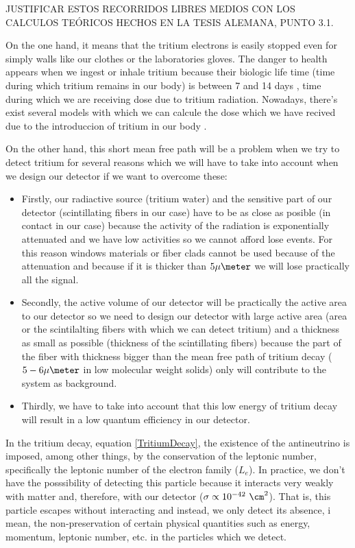 JUSTIFICAR ESTOS RECORRIDOS LIBRES MEDIOS CON LOS CALCULOS TEÓRICOS HECHOS EN LA TESIS ALEMANA, PUNTO 3.1.

On the one hand, it means that the tritium electrons is easily stopped even for simply walls like our clothes or the laboratories gloves. The danger to health appears when we ingest or inhale tritium because their biologic life time (time during which tritium remains in our body) is between 7 and 14 days \cite{asdfass}, time during which we are receiving dose due to tritium radiation. Nowadays, there's exist several models with which we can calcule the dose which we have recived due to the introduccion of tritium in our body \cite{asdfasdf}. 

On the other hand, this short mean free path will be a problem when we try to detect tritium for several reasons which we will have to take into account when we design our detector if we want to overcome these: 

\begin{itemize}
\item{} Firstly, our radiactive source (tritium water) and the sensitive part of our detector (scintillating fibers in our case) have to be as close as posible (in contact in our case) because the activity of the radiation is exponentially attenuated and we have low activities so we cannot afford lose events. For this reason windows materials or fiber clads cannot be used because of the attenuation and because if it is thicker than $5\mu\meter$ we will lose practically all the signal.

\item{} Secondly, the active volume of our detector will be practically the active area to our detector so we need to design our detector with large active area (area or the scintilalting fibers with which we can detect tritium) and a thickness as small as possible (thickness of the scintillating fibers) because the part of the fiber with thickness bigger than the mean free path of tritium decay ($5-6 \mu\meter$ in low molecular weight solids) only will contribute to the system as background.

\item{} Thirdly, we have to take into account that this low energy of tritium decay will result in a low quantum efficiency in our detector.

\end{itemize}

In the tritium decay, equation \ref{TritiumDecay}, the existence of the antineutrino is imposed, among other things, by the conservation of the leptonic number, specifically the leptonic number of the electron family ($L_e$). In practice, we don't have the posssibility of detecting this particle because it interacts very weakly with matter and, therefore, with our detector ($\sigma \propto 10^{-42} ~ \cm^2$). That is, this particle escapes without interacting and instead, we only detect its absence, i mean, the non-preservation of certain physical quantities such as energy, momentum, leptonic number, etc. in the particles which we detect.

